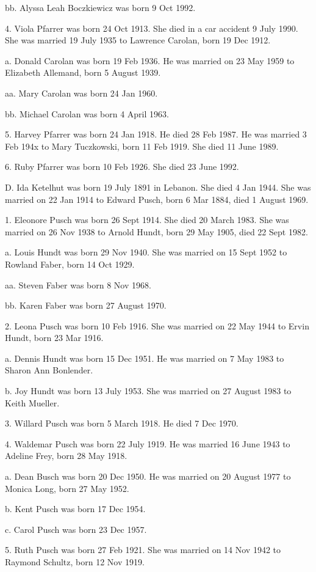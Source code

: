 \documentclass[a4paper]{article}
\begin{document}
bb. Alyssa Leah Boczkiewicz was born 9 Oct 1992.

4. Viola Pfarrer was born 24 Oct 1913.  She died in a car accident 9 July 1990. She was married 19 July 1935 to Lawrence Carolan, born 19 Dec 1912.  

a. Donald Carolan was born 19 Feb 1936.  He was married on 23 May 1959 to Elizabeth Allemand, born 5 August 1939.

aa. Mary Carolan was born 24 Jan 1960.

bb. Michael Carolan was born 4 April 1963.

5. Harvey Pfarrer was born 24 Jan 1918.  He died 28 Feb 1987.  He was married 3 Feb 194x to Mary Tuczkowski, born 11 Feb 1919.  She died 11 June 1989.

6. Ruby Pfarrer was born 10 Feb 1926.  She died 23 June 1992.

D. Ida Ketelhut was born 19 July 1891 in Lebanon.  She died 4 Jan 1944.  She was married on 22 Jan 1914 to Edward Pusch, born 6 Mar 1884, died 1 August 1969.

1. Eleonore Pusch was born 26 Sept 1914.  She died 20 March 1983.  She was  married on 26 Nov 1938 to Arnold Hundt, born 29 May 1905, died 22 Sept 1982.

a. Louis Hundt was born 29 Nov 1940.   She was married on 15 Sept 1952 to Rowland Faber, born 14 Oct 1929.  

aa. Steven Faber was born 8 Nov 1968.

bb. Karen Faber was born 27 August 1970.

2. Leona Pusch was born 10 Feb 1916.  She was married on 22 May 1944 to Ervin Hundt, born 23 Mar 1916.

a. Dennis Hundt was born 15 Dec 1951.  He was married on 7 May 1983 to Sharon Ann Bonlender.

b. Joy Hundt was born 13 July 1953.  She was married on 27 August 1983 to Keith Mueller.

3. Willard Pusch was born 5 March 1918.  He died 7 Dec 1970.  

4. Waldemar Pusch was born 22 July 1919.  He was married 16 June 1943 to Adeline Frey, born 28 May 1918.

a. Dean Busch was born 20 Dec 1950.  He was married on 20 August 1977 to Monica Long, born 27 May 1952. 

b. Kent Pusch was born 17 Dec 1954.

c. Carol Pusch was born 23 Dec 1957.

5. Ruth Pusch was born 27 Feb 1921.  She was married on 14 Nov 1942 to Raymond Schultz, born 12 Nov 1919.
\end{document}
